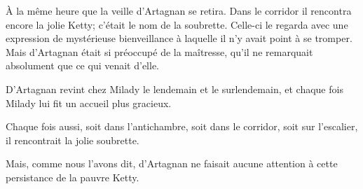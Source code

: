 À la même heure que la veille d'Artagnan se retira. Dans le corridor il rencontra encore la jolie Ketty; c'était le nom de la soubrette. Celle-ci le regarda avec une expression de mystérieuse bienveillance à laquelle il n'y avait point à se tromper. Mais d'Artagnan était si préoccupé de la maîtresse, qu'il ne remarquait absolument que ce qui venait d'elle. 

D'Artagnan revint chez Milady le lendemain et le surlendemain, et chaque fois Milady lui fit un accueil plus gracieux. 

Chaque fois aussi, soit dans l'antichambre, soit dans le corridor, soit sur l'escalier, il rencontrait la jolie soubrette. 

Mais, comme nous l'avons dit, d'Artagnan ne faisait aucune attention à cette persistance de la pauvre Ketty.